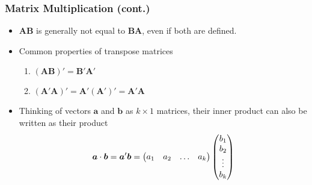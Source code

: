\documentclass[pdflatex, 12pt]{beamer}
\begin{document}
\begin{frame}
\frametitle{Matrix Multiplication (cont.)}
\begin{itemize}
\item $\bm{AB}$ is generally not equal to $\bm{BA}$, even if both are defined.
\vspace{0.4cm}
\item Common properties of transpose matrices
 \begin{enumerate}
 \item $(\bm{AB})' = \bm{B}'\bm{A}'$
 \item $(\bm{A}'\bm{A})' = \bm{A}'(\bm{A}')' = \bm{A'A}$
 \end{enumerate}
\vspace{0.4cm}
\item Thinking of vectors $\bm{a}$ and $\bm{b}$ as $k \times 1$ matrices, their inner product can also be written as their product
 \begin{equation}
 \bm{a} \cdot \bm{b} = \bm{a}'\bm{b} = \begin{pmatrix}
 a_1 & a_2 & \ldots & a_k \\
 \end{pmatrix} \begin{pmatrix}
 b_1 \\
 b_2 \\
 \vdots \\
 b_k
 \end{pmatrix} \notag 
 \end{equation}
\end{itemize}
\end{frame}
\end{document}
